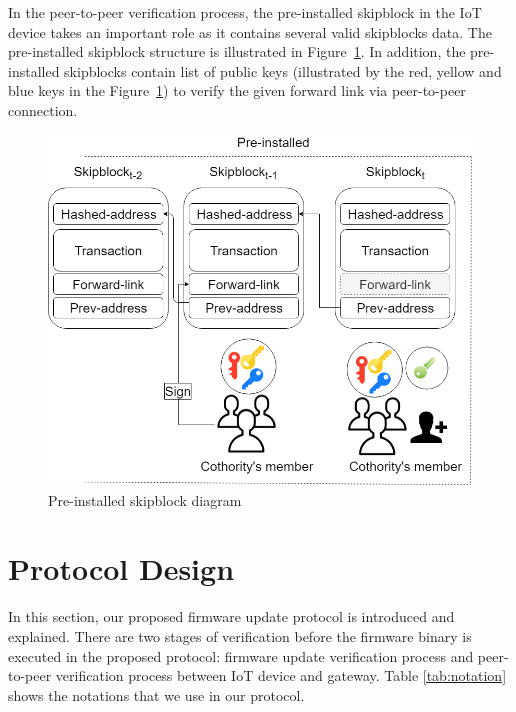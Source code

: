 In the peer-to-peer verification process, the pre-installed skipblock in the IoT device takes an important role as it contains several valid skipblocks data. The pre-installed skipblock structure is illustrated in Figure~\ref{fig:preinstalled}. In addition, the pre-installed skipblocks contain list of public keys (illustrated by the red, yellow and blue keys in the Figure~\ref{fig:preinstalled}) to verify the given forward link via peer-to-peer connection.

\begin{figure}[H]
	\begin{center}
		\includegraphics[width=1.0\textwidth]{figures/firmware_update-preinstalled_skipblock.png}
		\caption{Pre-installed skipblock diagram} 
		\label{fig:preinstalled}
	\end{center}
\end{figure}

\section{Protocol Design}
\label{cha:4_protocoldesign}

In this section, our proposed firmware update protocol is introduced and explained. There are two stages of verification before the firmware binary is executed in the proposed protocol: firmware update verification process and peer-to-peer verification process between IoT device and gateway. Table \ref{tab:notation} shows the notations that we use in our protocol.

